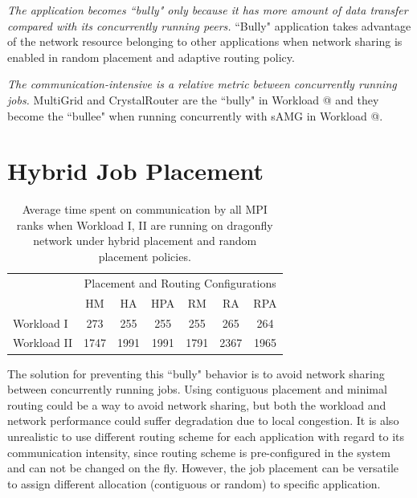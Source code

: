 \documentclass[conference,compsoc]{IEEEtran}
\makeatletter
\newcommand{\Rmnum}[1]{\expandafter\@slowromancap\romannumeral #1@}
\makeatother
\begin{document}
\emph{The application becomes ``bully" only because it has more amount of data transfer compared with its concurrently running peers.} ``Bully" application takes advantage of the network resource belonging to other applications when network sharing is enabled in random placement and adaptive routing policy. 


\emph{The communication-intensive is a relative metric between concurrently running jobs.} MultiGrid and CrystalRouter are the ``bully" in Workload \Rmnum{1} and they become the ``bullee" when running concurrently with sAMG in Workload \Rmnum{2}.


\section{Hybrid Job Placement}

\begin{table}[ht]
\begin{center}
\caption{Average time spent on communication by all MPI ranks when Workload I, II are running on dragonfly network under hybrid placement and random placement policies.} 
\label{tab: hyb-placement-wkld-commtime}
\begin{tabular}{l c c c c c c }
\toprule %
\toprule
&\multicolumn{6}{c}{Placement and Routing Configurations} \\ %
\cmidrule(l){2-7}
	      & HM & HA & HPA & RM & RA & RPA \\ %
\midrule %
Workload I  &273 &255 &255 &255 &265 &264  \\ %
\midrule
Workload II &1747 &1991 &1991 &1791 &2367 &1965 \\
\midrule %
\bottomrule %
\end{tabular}
\end{center}
\end{table}



The solution for preventing this ``bully" behavior is to avoid network sharing between concurrently running jobs. Using contiguous placement and minimal routing could be a way to avoid network sharing, but both the workload and network performance could suffer degradation due to local congestion. It is also unrealistic to use different routing scheme for each application with regard to its communication intensity, since routing scheme is pre-configured in the system and can not be changed on the fly. However, the job placement can be versatile to assign different allocation (contiguous or random) to specific application.
\end{document}
